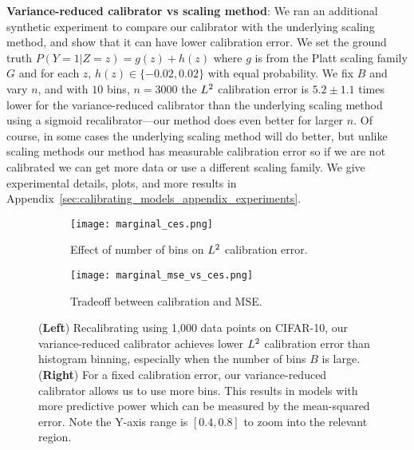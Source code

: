 \textbf{Variance-reduced calibrator vs scaling method}: We ran an additional synthetic experiment to compare our calibrator with the underlying scaling method, and show that it can have lower calibration error. We set the ground truth $P(Y = 1 | Z=z) = g(z) + h(z)$ where $g$ is from the Platt scaling family $G$ and for each $z$, $h(z) \in \{-0.02, 0.02\}$ with equal probability. We fix $B$ and vary $n$, and with $10$ bins, $n = 3000$ the $L^2$ calibration error is $5.2 \pm 1.1$ times lower for the variance-reduced calibrator than the underlying scaling method using a sigmoid recalibrator---our method does even better for larger $n$. Of course, in some cases the underlying scaling method will do better, but unlike scaling methods our method has measurable calibration error so if we are not calibrated we can get more data or use a different scaling family. We give experimental details, plots, and more results in Appendix~\ref{sec:calibrating_models_appendix_experiments}.

\begin{figure}
  \centering
  \centering
     \begin{subfigure}[b]{0.54\textwidth}
         \centering
         \texttt{[image: marginal\_ces.png]}
         \caption{Effect of number of bins on $L^2{}$ calibration error.}
         \label{fig:marginal_calibrator_comparison_cifar}
     \end{subfigure}
     \hfill
     \begin{subfigure}[b]{0.44\textwidth}
         \centering
         \texttt{[image: marginal\_mse\_vs\_ces.png]}
         \caption{Tradeoff between calibration and MSE.}
         \label{fig:cifar_calibrator_cmp_mse_ce}
     \end{subfigure}
  \caption{
  (\textbf{Left}) Recalibrating using 1,000 data points on CIFAR-10, our variance-reduced calibrator achieves lower $L^2{}$ calibration error than histogram binning, especially when the number of bins $B$ is large.
  (\textbf{Right}) For a fixed calibration error, our variance-reduced calibrator allows us to use more bins. This results in models with more predictive power which can be measured by the mean-squared error. Note the Y-axis range is $[0.4, 0.8]$ to zoom into the relevant region.
  }
  \label{fig:nan2}
\end{figure}
